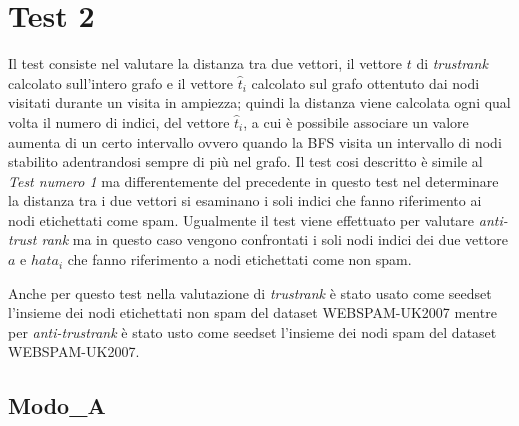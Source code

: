 \section{Test 2}
Il test consiste nel valutare la distanza tra due vettori, il vettore \(t\) di \textit{trustrank} calcolato sull'intero grafo e il vettore \(\hat{t}_i\) calcolato sul grafo ottentuto dai nodi visitati durante un visita in ampiezza; quindi la distanza viene calcolata ogni qual volta il numero di indici, del vettore \(\hat{t}_i\), a cui è possibile associare un valore aumenta  di un certo intervallo ovvero  quando la BFS visita un intervallo di nodi stabilito adentrandosi sempre di più nel grafo. Il test cosi descritto è simile al \textit{Test numero 1} ma differentemente del precedente in questo test nel determinare la distanza tra i due vettori si esaminano i soli indici che fanno riferimento ai nodi etichettati come spam. Ugualmente il test viene effettuato per valutare \textit{anti-trust rank} ma in questo caso vengono confrontati i soli nodi indici dei due vettore \(a\) e \(hat{a}_i\) che fanno riferimento a nodi etichettati come non spam.

Anche per questo test nella valutazione di \textit{trustrank} è stato usato come seedset l'insieme dei nodi etichettati non spam del dataset WEBSPAM-UK2007 mentre per \textit{anti-trustrank} è stato usto come seedset l'insieme dei nodi spam del dataset WEBSPAM-UK2007.

\subsection{Modo\_A}

